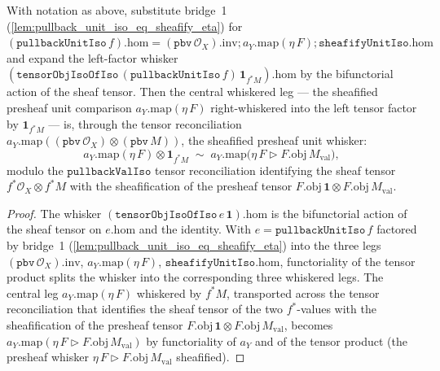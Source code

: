 \begin{lemma}
  \label{lem:pullback_unit_iso_whisker_eq_sheafify_eta_whisker_3a}
  With notation as above, substitute bridge~1
  (\cref{lem:pullback_unit_iso_eq_sheafify_eta}) for \((\mathtt{pullbackUnitIso}\,f).\mathrm{hom}
  = (\mathtt{pbv}\,\mathcal{O}_X).\mathrm{inv} \mathbin{;} a_Y.\mathrm{map}(\eta\,F) \mathbin{;}
  \mathtt{sheafifyUnitIso}.\mathrm{hom}\) and expand the left-factor whisker
  \((\mathtt{tensorObjIsoOfIso}\,(\mathtt{pullbackUnitIso}\,f)\,\mathbf 1_{f^{*}M}).\mathrm{hom}\) by
  the bifunctorial action of the sheaf tensor. Then the central whiskered leg --- the sheafified
  presheaf unit comparison \(a_Y.\mathrm{map}(\eta\,F)\) right-whiskered into the left tensor factor by
  \(\mathbf 1_{f^{*}M}\) --- is, through the tensor reconciliation
  \(a_Y.\mathrm{map}((\mathtt{pbv}\,\mathcal{O}_X)\otimes(\mathtt{pbv}\,M))\), the sheafified presheaf
  unit whisker:
  \[
    a_Y.\mathrm{map}(\eta\,F) \otimes \mathbf 1_{f^{*}M}
      \;\sim\;
    a_Y.\mathrm{map}\bigl(\eta\,F \rhd F.\mathrm{obj}\,M_{\mathrm{val}}\bigr),
  \]
  modulo the \(\mathtt{pullbackValIso}\) tensor reconciliation identifying the sheaf tensor
  \(f^{*}\mathcal{O}_X \otimes f^{*}M\) with the sheafification of the presheaf tensor
  \(F.\mathrm{obj}\,\mathbf 1 \otimes F.\mathrm{obj}\,M_{\mathrm{val}}\).
\end{lemma}
\begin{proof}
  The whisker \((\mathtt{tensorObjIsoOfIso}\,e\,\mathbf 1).\mathrm{hom}\) is the bifunctorial action of
  the sheaf tensor on \(e.\mathrm{hom}\) and the identity. With \(e = \mathtt{pullbackUnitIso}\,f\)
  factored by bridge~1 (\cref{lem:pullback_unit_iso_eq_sheafify_eta}) into the three legs
  \((\mathtt{pbv}\,\mathcal{O}_X).\mathrm{inv}\), \(a_Y.\mathrm{map}(\eta\,F)\),
  \(\mathtt{sheafifyUnitIso}.\mathrm{hom}\), functoriality of the tensor product splits the whisker
  into the corresponding three whiskered legs. The central leg \(a_Y.\mathrm{map}(\eta\,F)\)
  whiskered by \(f^{*}M\), transported across the tensor reconciliation that identifies the sheaf
  tensor of the two \(f^{*}\)-values with the sheafification of the presheaf tensor
  \(F.\mathrm{obj}\,\mathbf 1 \otimes F.\mathrm{obj}\,M_{\mathrm{val}}\), becomes
  \(a_Y.\mathrm{map}(\eta\,F \rhd F.\mathrm{obj}\,M_{\mathrm{val}})\) by functoriality of \(a_Y\) and
  of the tensor product (the presheaf whisker \(\eta\,F \rhd F.\mathrm{obj}\,M_{\mathrm{val}}\)
  sheafified).
\end{proof}


